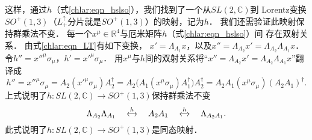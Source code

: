 这样，通过$h$（式\eqref{chlar:eqn_hslso}），我们找到了一个从$SL(2,\mathbb{C})$到
Lorentz变换$SO^{+}(1,3)$（$L^{\uparrow}_{+}$分片就是$SO^{+}(1,3)$）的映射，记为$h$．
我们还需验证此映射保持群乘法不变．
每一个$x^\mu \in \mathbb{R}^4$与厄米矩阵$h$（式\eqref{chlar:eqn_hslso}）间
存在双射关系．
由式\eqref{chlar:eqn_LT}有如下变换，
$x'=\Lambda_{A_1} x$，以及$x''=\Lambda_{A_2} x'=\Lambda_{A_2} \Lambda_{A_1}x$．
令$h''=x''^\mu \sigma_\mu$，$h'=x'^\mu \sigma_\mu$．
用$x^\mu $与$h$间的双射关系将“$x''=\Lambda_{A_2} x'=\Lambda_{A_2} \Lambda_{A_1}x$”翻译成
\begin{equation*}
    h''=x''^\mu \sigma_\mu=A_2 (x'^\mu \sigma_\mu) A_2^\dagger
    =A_2 \bigl( A_1(x^\mu \sigma_\mu)A_1^\dagger \bigr) A_2^\dagger
    = A_2 A_1 (x^\mu \sigma_\mu) (A_2A_1)^\dagger .
\end{equation*}
上式说明了$h:SL(2,\mathbb{C})\to SO^{+}(1,3)$保持群乘法不变
\begin{equation}
    \Lambda_{A_2}\Lambda_{A_1} \quad \xleftrightarrow{h} \quad  A_2 A_1
     \quad \xleftrightarrow{h}\quad \Lambda_{A_2 A_1}.
\end{equation}
此式说明了$h:SL(2,\mathbb{C})\to SO^{+}(1,3)$是同态映射．


